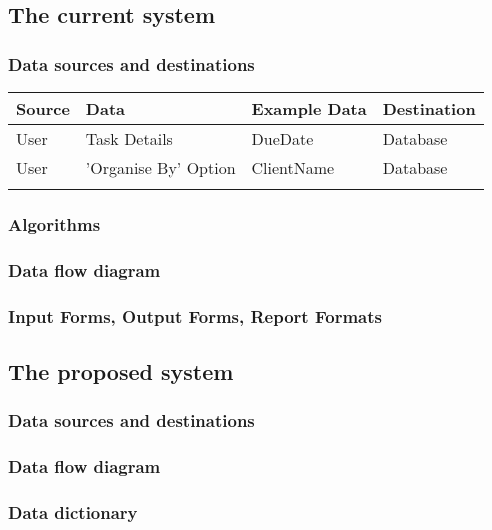 \subsection{The current system}

\subsubsection{Data sources and destinations}
\begin{center}
	\begin{tabular}{|p{2cm}|p{4cm}|p{2cm}|p{2cm}|}
		\hline
		\textbf{Source} & \textbf{Data} & \textbf{Example Data} & \textbf{Destination} \\ \hline
		User & Task Details & DueDate &  Database \\ \hline
		User & 'Organise By' Option & ClientName & Database \\ \line
		
	\end{tabular}
\end{center}
\subsubsection{Algorithms}

\subsubsection{Data flow diagram}

\subsubsection{Input Forms, Output Forms, Report Formats}

\subsection{The proposed system}

\subsubsection{Data sources and destinations}

\subsubsection{Data flow diagram}

\subsubsection{Data dictionary}

